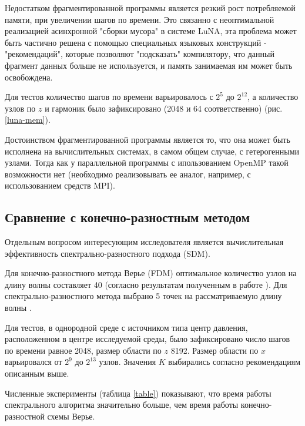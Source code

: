 Недостатком фрагментированной программы является резкий рост потребляемой памяти, при увеличении шагов по времени.
Это связанно с неоптимальной реализацией асинхронной "сборки мусора" в системе LuNA,
эта проблема может быть частично решена с помощью специальных языковых конструкций - "рекомендаций",
которые позволяют "подсказать" компилятору, что данный фрагмент данных больше не используется, и память занимаемая им может быть освобождена.

Для тестов количество шагов по времени варьировалось с $2^5$ до $2^{12}$, а количество узлов по $z$
и гармоник было зафиксировано (2048 и 64 соответственно) (рис. \ref{luna-mem}).


Достоинством фрагментированной программы является то, что она может быть исполнена на
вычислительных системах, в самом общем случае, с гетерогенными узлами.
Тогда как у параллельной программы с ипользованием OpenMP такой возможности нет
(необходимо реализовывать ее аналог, например, с использованием средств MPI).

\subsection{Сравнение с конечно-разностным методом}

Отдельным вопросом интересующим исследователя является вычислительная эффективность спектрально-разностного подхода (SDM).

Для конечно-разностного метода Верье (FDM) оптимальное количество узлов на длину волны составляет 40 (согласно результатам полученным в работе \cite{vir}).
Для спектрально-разностного метода выбрано 5 точек на рассматриваемую длину волны \cite{mart}.

Для тестов, в однородной среде с источником типа центр давления, расположенном в центре исследуемой среды,
было зафиксировано число шагов по времени равное 2048, размер области по $z$ 8192.
Размер области по $x$ варьировался от $2^9$ до $2^{13}$ узлов. Значения $K$ выбирались согласно рекомендациям описанным выше.

Численные эксперименты (таблица \ref{table}) показывают, что время работы спектрального алгоритма значительно больше,
чем время работы конечно-разностной схемы Верье.

